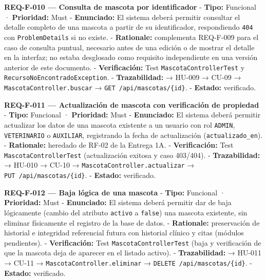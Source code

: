 \documentclass[
]{article}
\begin{document}
\textbf{REQ-F-010 --- Consulta de mascota por identificador} -
\textbf{Tipo:} Funcional · \textbf{Prioridad:} Must -
\textbf{Enunciado:} El sistema deberá permitir consultar el detalle
completo de una mascota a partir de su identificador, respondiendo
\texttt{404} con \texttt{ProblemDetails} si no existe. -
\textbf{Rationale:} complementa REQ-F-009 para el caso de consulta
puntual, necesario antes de una edición o de mostrar el detalle en la
interfaz; no estaba desglosado como requisito independiente en una
versión anterior de este documento. - \textbf{Verificación:} Test
\texttt{MascotaControllerTest} y \texttt{RecursoNoEncontradoException}.
- \textbf{Trazabilidad:} → HU-009 → CU-09 →
\texttt{MascotaController.buscar} → \texttt{GET\ /api/mascotas/\{id\}}.
- \textbf{Estado:} verificado.

\textbf{REQ-F-011 --- Actualización de mascota con verificación de
propiedad} - \textbf{Tipo:} Funcional · \textbf{Prioridad:} Must -
\textbf{Enunciado:} El sistema deberá permitir actualizar los datos de
una mascota existente a un usuario con rol \texttt{ADMIN},
\texttt{VETERINARIO} o \texttt{AUXILIAR}, registrando la fecha de
actualización (\texttt{actualizado\_en}). - \textbf{Rationale:} heredado
de RF-02 de la Entrega 1A. - \textbf{Verificación:} Test
\texttt{MascotaControllerTest} (actualización exitosa y caso 403/404). -
\textbf{Trazabilidad:} → HU-010 → CU-10 →
\texttt{MascotaController.actualizar} →
\texttt{PUT\ /api/mascotas/\{id\}}. - \textbf{Estado:} verificado.

\textbf{REQ-F-012 --- Baja lógica de una mascota} - \textbf{Tipo:}
Funcional · \textbf{Prioridad:} Must - \textbf{Enunciado:} El sistema
deberá permitir dar de baja lógicamente (cambio del atributo
\texttt{activo} a \texttt{false}) una mascota existente, sin eliminar
físicamente el registro de la base de datos. - \textbf{Rationale:}
preservación de historial e integridad referencial futura con historial
clínico y citas (módulos pendientes). - \textbf{Verificación:} Test
\texttt{MascotaControllerTest} (baja y verificación de que la mascota
deja de aparecer en el listado activo). - \textbf{Trazabilidad:} →
HU-011 → CU-11 → \texttt{MascotaController.eliminar} →
\texttt{DELETE\ /api/mascotas/\{id\}}. - \textbf{Estado:} verificado.
\end{document}
